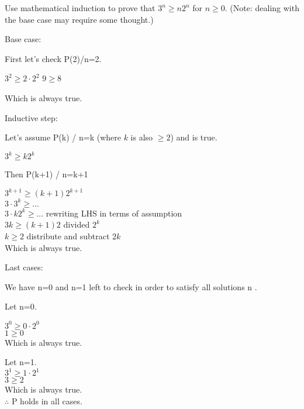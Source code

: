 
\begin{problem}
Use mathematical induction to prove that $3^n \ge n2^n$ for $n\ge 0$. 
(Note: dealing with the base case may require some thought.)
\end{problem}

\begin{flushleft}
Base case:

First let's check P(2)/n=2.

$3^2 \ge 2\cdot2^2$
$9 \ge 8$

Which is always true.

\vskip 0.1in
Inductive step:

Let's assume P(k) / n=k (where $k$ is also $\ge 2$) and is true.

$3^k \ge k2^k$

Then P(k+1) / n=k+1

$3^{k+1} \ge (k+1)2^{k+1}$ \\
$3\cdot3^k \ge ...$  \\
$3\cdot k 2^k \ge ...$ rewriting LHS in terms of assumption \\
$3k \ge (k+1)2$ divided $2^k$ \\
$k \ge 2$ distribute and subtract $2k$ \\
Which is always true.

\vskip 0.1in
Last cases:

We have n=0 and n=1 left to check in order to satisfy all solutions n .

Let n=0.

$3^0 \ge 0\cdot2^0$\\
$1 \ge 0$\\

Which is always true.

Let n=1.\\
$3^1 \ge 1\cdot2^1$\\
$3 \ge 2$\\
Which is always true.\\

\vskip 0.1in
$\therefore$ P holds in all cases.

\end{flushleft}



